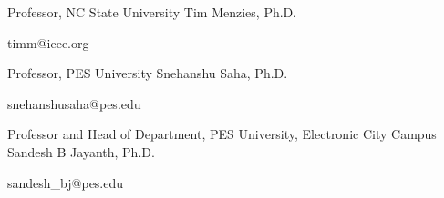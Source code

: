 
\begin{cventries}
\cventry
        {Professor, NC State University}
        {Tim Menzies, Ph.D.}
        {}
        {}
        {
            \begin{cvitems}
                \item timm@ieee.org
            \end{cvitems}
        }
    \cventry
        {Professor, PES University}
        {Snehanshu Saha, Ph.D.}
        {}
        {}
        {
            \begin{cvitems}
                \item snehanshusaha@pes.edu
            \end{cvitems}
        }
    
    \cventry
        {Professor and Head of Department, PES University, Electronic City Campus}
        {Sandesh B Jayanth, Ph.D.}
        {}
        {}
        {
            \begin{cvitems}
                \item sandesh\_bj@pes.edu
            \end{cvitems}
        }
\end{cventries}